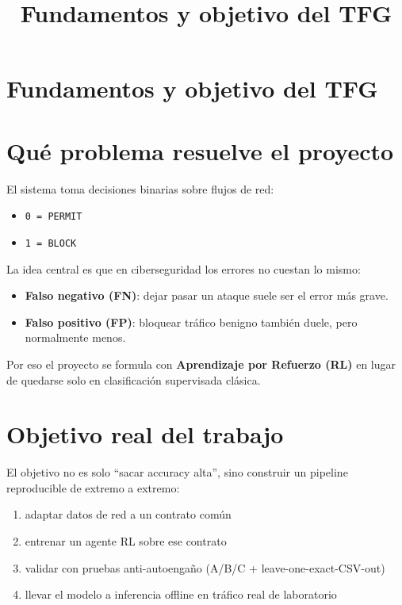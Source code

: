 ﻿\documentclass[12pt,a4paper]{article}
\title{Fundamentos y objetivo del TFG}
\date{}
\begin{document}
\maketitle
\section{Fundamentos y objetivo del TFG}

\section{Qué problema resuelve el proyecto}

El sistema toma decisiones binarias sobre flujos de red:

\begin{itemize}
  \item \texttt{0 = PERMIT}
  \item \texttt{1 = BLOCK}
\end{itemize}

La idea central es que en ciberseguridad los errores no cuestan lo mismo:

\begin{itemize}
  \item \textbf{Falso negativo (FN)}: dejar pasar un ataque suele ser el error más grave.
  \item \textbf{Falso positivo (FP)}: bloquear tráfico benigno también duele, pero normalmente menos.
\end{itemize}

Por eso el proyecto se formula con \textbf{Aprendizaje por Refuerzo (RL)} en lugar de quedarse solo
en clasificación supervisada clásica.

\section{Objetivo real del trabajo}

El objetivo no es solo ``sacar accuracy alta'', sino construir un pipeline reproducible de extremo a
extremo:

\begin{enumerate}
  \item adaptar datos de red a un contrato común
  \item entrenar un agente RL sobre ese contrato
  \item validar con pruebas anti-autoengaño (A/B/C + leave-one-exact-CSV-out)
  \item llevar el modelo a inferencia offline en tráfico real de laboratorio
\end{enumerate}
\end{document}
